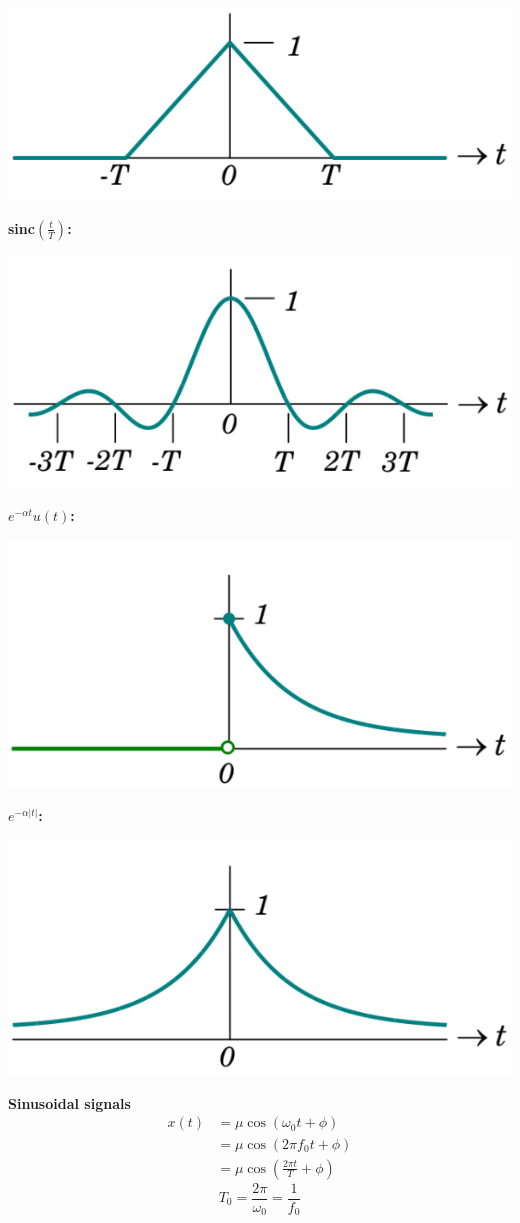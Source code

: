 \documentclass[landscape,a4paper]{extarticle}
\newenvironment{Figure}
  {\par\medskip\noindent\minipage{\linewidth}}
  {\endminipage\par\medskip}
\begin{document}
\begin{multicols*}{5}
\begin{Figure}
        \centering
        \includegraphics[width=0.8\linewidth]{tri.png}
    \end{Figure}
    \textbf{sinc$\left(\frac{t}{T}\right)$:}
    \begin{Figure}
        \centering
        \includegraphics[width=0.8\linewidth]{sinc.png}
    \end{Figure}
    \textbf{$e^{-\alpha t}u(t)$: }
    \begin{Figure}
        \centering
        \includegraphics[width=0.8\linewidth]{rightSidedDecayingExp.png}
    \end{Figure}
    \textbf{$e^{-\alpha |t|}$: }
    \begin{Figure}
        \centering
        \includegraphics[width=0.8\linewidth]{twoSidedDecayingExp.png}
    \end{Figure}
    \textbf{Sinusoidal signals}
    \begin{align*}
        x(t)&=\mu \cos(\omega_0t+\phi)\\
        &= \mu\cos(2\pi f_0t + \phi)\\
        &= \mu\cos(\frac{2\pi t}{T} + \phi)
    \end{align*} \newline
    \[
        T_0=\frac{2\pi}{\omega_0}=\frac{1}{f_0}
    \]


\end{multicols*}
\end{document}
